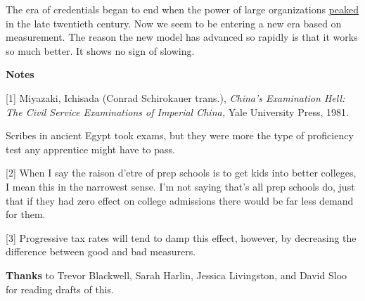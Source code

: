 The era of credentials began to
                  end when the power of large organizations
                  \href{http://www.paulgraham.com/highres.html}{peaked} in the late twentieth
                  century. Now we seem to be entering a new era based on
                  measurement. The reason the new model has advanced so rapidly
                  is that it works so much better. It shows no sign of
                  slowing.









\textbf{Notes}

[1] Miyazaki, Ichisada (Conrad Schirokauer trans.),
                  \emph{China's Examination Hell: The Civil Service Examinations of
                    Imperial China,}
                  Yale University Press, 1981.

Scribes in ancient
                  Egypt took exams, but they were more the type of proficiency
                  test any apprentice might have to pass.

[2] When I say the raison d'etre of prep schools is to get kids
                  into better colleges, I mean this in the narrowest sense. I'm
                  not saying that's all prep schools do, just that if they had
                  zero effect on college admissions there would be far less
                  demand for them.

[3] Progressive tax rates will tend to damp this effect,
                  however, by decreasing the difference between good and bad
                  measurers.

\textbf{Thanks} to Trevor Blackwell, Sarah
                  Harlin, Jessica Livingston, and David Sloo for reading drafts
                  of this.



              
            
          
            
              
                


                  
              
            
          
